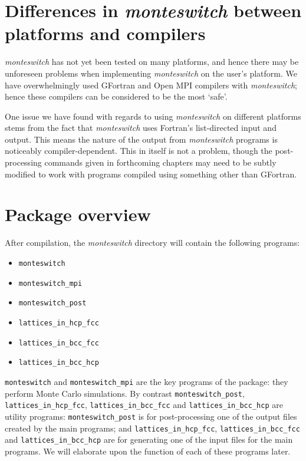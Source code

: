 \documentclass{report}
\begin{document}
\section{Differences in \emph{monteswitch} between platforms and compilers}
\emph{monteswitch} has not yet been tested on many platforms, and hence there may be unforeseen problems when implementing \emph{monteswitch} on
the user's platform. We have overwhelmingly used GFortran and Open MPI compilers with \emph{monteswitch}; hence these compilers can be considered 
to be the most `safe'.

One issue we have found with regards to using \emph{monteswitch} on different platforms stems from the fact that \emph{monteswitch} uses Fortran's 
list-directed input and output. This means the nature of the output from \emph{monteswitch} programs is noticeably compiler-dependent. This in itself
is not a problem, though the post-processing commands given in forthcoming chapters may need to be subtly modified to work with programs compiled using 
something other than GFortran.

\section{Package overview}
After compilation, the \emph{monteswitch} directory will contain the following programs:
\begin{itemize}
\item\texttt{monteswitch}
\item\texttt{monteswitch\_mpi}
\item\texttt{monteswitch\_post}
\item\texttt{lattices\_in\_hcp\_fcc}
\item\texttt{lattices\_in\_bcc\_fcc}
\item\texttt{lattices\_in\_bcc\_hcp}
\end{itemize}
\texttt{monteswitch} and \texttt{monteswitch\_mpi} are the key programs of the package: they perform Monte Carlo simulations. 
By contrast \texttt{monteswitch\_post}, \texttt{lattices\_in\_hcp\_fcc}, \texttt{lattices\_in\_bcc\_fcc} and 
\texttt{lattices\_in\_bcc\_hcp} are utility programs: \texttt{monteswitch\_post} is for post-processing one of the output files created 
by the main programs; and \texttt{lattices\_in\_hcp\_fcc}, \texttt{lattices\_in\_bcc\_fcc} and \texttt{lattices\_in\_bcc\_hcp} are for generating 
one of the input files for the main programs. We will elaborate upon the function of each of these programs later.
\end{document}
